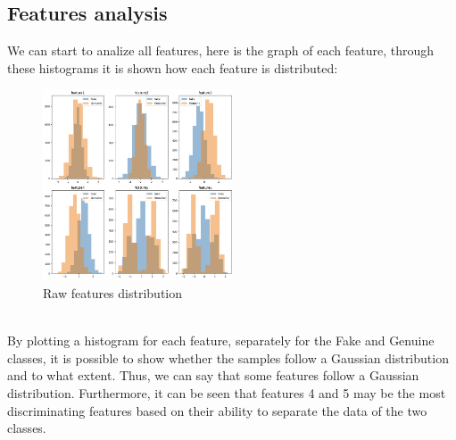 \documentclass{article}
\begin{document}
\subsection{Features analysis}
We can start to analize all features, here is the graph of each feature, through these histograms it is shown how each feature is distributed:\\
\begin{figure}[ht]
        \centering
        \includegraphics[width=0.5\textwidth]{./img/AllFeatures.png}
        \caption{Raw features distribution}
        \label{fig:AllFeatures}
\end{figure}  
\\
By plotting a histogram for each feature, separately for the Fake and Genuine classes, it is possible to show whether the samples follow a Gaussian distribution and to what extent. 
Thus, we can say that some features follow a Gaussian distribution. Furthermore, it can be seen that features 4 and 5 may be the most discriminating features based on their ability to separate the data of the two classes.\\
\end{document}
